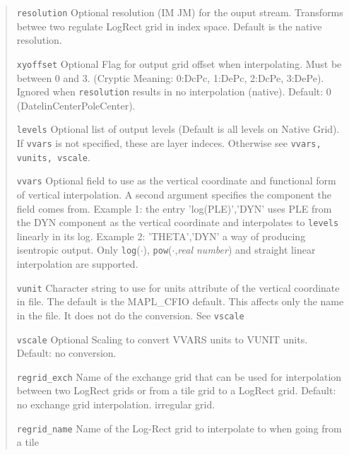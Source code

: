 \begin{quote}
\begin{trivlist}
 \item[\tt resolution]    Optional resolution (IM JM) for the ouput stream.
                          Transforms betwee two regulate LogRect grid in index space. 
                          Default is the native resolution.
 \item[\tt xyoffset]      Optional Flag for output grid offset when interpolating. Must be
                          between 0 and 3. (Cryptic Meaning: 0:DcPc, 1:DePc, 2:DcPe, 3:DePe).
                          Ignored when {\tt resolution} results in no interpolation (native).
                          Default: 0 (DatelinCenterPoleCenter). 
 \item[\tt levels]        Optional list of output levels (Default is all levels on Native Grid).
                          If {\tt vvars} is not specified, these are layer indeces. Otherwise
                          see {\tt vvars, vunits, vscale}.
 \item[\tt vvars]         Optional field to use as the vertical coordinate and functional form
                          of vertical interpolation. A second argument specifies 
                          the component the field comes from. 
                          Example 1: the entry 'log(PLE)','DYN' uses PLE from the
                          DYN component as the vertical coordinate and interpolates
                          to {\tt levels} linearly in its log. Example 2: 'THETA','DYN'
                          a way of producing isentropic output.
                          Only {\tt log}($\cdot$), {\tt pow}($\cdot$,{\em real number})
                          and straight linear interpolation are supported.
 \item[\tt vunit]         Character string to use for units attribute of the vertical 
                          coordinate in file. 
                          The default is the MAPL\_CFIO default. 
                          This affects only the name in the file.
                          It does not do the conversion. See {\tt vscale}
 \item[\tt vscale]        Optional Scaling to convert VVARS units to VUNIT units.
                          Default: no conversion.
 \item[\tt regrid\_exch]  Name of the exchange grid that can be used for interpolation
                          between two LogRect grids or from a tile grid to a LogRect grid.
                          Default: no exchange grid interpolation.
                          irregular grid.
 \item[\tt regrid\_name]  Name of the Log-Rect grid to interpolate to when going from a tile 

\end{trivlist}
\end{quote}
